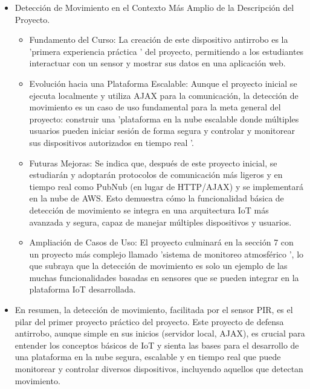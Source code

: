 \documentclass{report}
\begin{document}
\begin{itemize}
    \item Detección de Movimiento en el Contexto Más Amplio de la Descripción del Proyecto.
    \begin{itemize}
        \item Fundamento del Curso: La creación de este dispositivo antirrobo es la  'primera experiencia práctica ' del proyecto, permitiendo a los estudiantes 
        interactuar con un sensor y mostrar sus datos en una aplicación web.
        \item Evolución hacia una Plataforma Escalable: Aunque el proyecto inicial se ejecuta localmente y utiliza AJAX para la comunicación, la detección de 
        movimiento es un caso de uso fundamental para la meta general del proyecto: construir una  'plataforma en la nube escalable donde múltiples usuarios 
        pueden iniciar sesión de forma segura y controlar y monitorear sus dispositivos autorizados en tiempo real '.
        \item Futuras Mejoras: Se indica que, después de este proyecto inicial, se estudiarán y adoptarán protocolos de comunicación más ligeros y en 
        tiempo real como PubNub (en lugar de HTTP/AJAX) y se implementará en la nube de AWS. Esto demuestra cómo la funcionalidad básica de detección de 
        movimiento se integra en una arquitectura IoT más avanzada y segura, capaz de manejar múltiples dispositivos y usuarios.
        \item Ampliación de Casos de Uso: El proyecto culminará en la sección 7 con un proyecto más complejo llamado  'sistema de monitoreo atmosférico ', lo que 
        subraya que la detección de movimiento es solo un ejemplo de las muchas funcionalidades basadas en sensores que se pueden integrar en la plataforma IoT 
        desarrollada.
    \end{itemize}

    \item En resumen, la detección de movimiento, facilitada por el sensor PIR, es el pilar del primer proyecto práctico del proyecto. Este proyecto de defensa 
    antirrobo, aunque simple en sus inicios (servidor local, AJAX), es crucial para entender los conceptos básicos de IoT y sienta las bases para el desarrollo 
    de una plataforma en la nube segura, escalable y en tiempo real que puede monitorear y controlar diversos dispositivos, incluyendo aquellos que detectan 
    movimiento.
\end{itemize}
\end{document}

